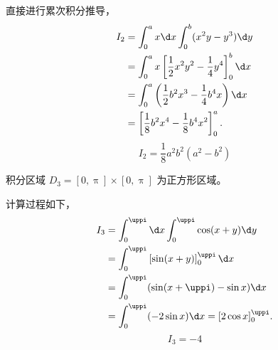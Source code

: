 \begin{solution}
    直接进行累次积分推导，
    \begin{equation}
        \begin{aligned}
            I_2 & = \int_{0}^{a} x \d x \int_{0}^{b} (x^2 y - y^3) \d y                          \\
                & = \int_{0}^{a} x \left[ \frac{1}{2} x^2 y^2 - \frac{1}{4} y^4 \right]_0^b \d x \\
                & = \int_{0}^{a} \left( \frac{1}{2} b^2 x^3 - \frac{1}{4} b^4 x \right) \d x     \\
                & = \left[ \frac{1}{8} b^2 x^4 - \frac{1}{8} b^4 x^2 \right]_0^a.
        \end{aligned}
    \end{equation}
    \begin{equation}
        I_2 = \boxed{\frac{1}{8} a^2 b^2 (a^2 - b^2)}
    \end{equation}

     积分区域 $D_3 = [0, \uppi] \times [0, \uppi]$ 为正方形区域。

    \begin{center}
    \end{center}

    计算过程如下，
    \begin{equation}
        \begin{aligned}
            I_3 & = \int_{0}^{\uppi} \d x \int_{0}^{\uppi} \cos(x + y) \d y    \\
                & = \int_{0}^{\uppi} \left[ \sin(x + y) \right]_0^{\uppi} \d x \\
                & = \int_{0}^{\uppi} (\sin(x + \uppi) - \sin x) \d x           \\
                & = \int_{0}^{\uppi} (-2 \sin x) \d x = [2 \cos x]_0^{\uppi}.
        \end{aligned}
    \end{equation}
    \begin{equation}
        I_3 = \boxed{-4}
    \end{equation}


\end{solution}
